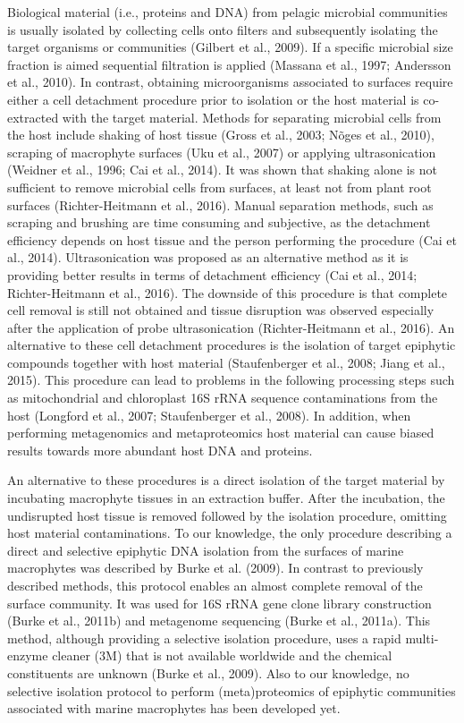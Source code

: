 \documentclass[12pt,]{article}
\begin{document}
Biological material (i.e., proteins and DNA) from pelagic microbial
communities is usually isolated by collecting cells onto filters and
subsequently isolating the target organisms or communities (Gilbert et
al., 2009). If a specific microbial size fraction is aimed sequential
filtration is applied (Massana et al., 1997; Andersson et al., 2010). In
contrast, obtaining microorganisms associated to surfaces require either
a cell detachment procedure prior to isolation or the host material is
co-extracted with the target material. Methods for separating microbial
cells from the host include shaking of host tissue (Gross et al., 2003;
Nõges et al., 2010), scraping of macrophyte surfaces (Uku et al., 2007)
or applying ultrasonication (Weidner et al., 1996; Cai et al., 2014). It
was shown that shaking alone is not sufficient to remove microbial cells
from surfaces, at least not from plant root surfaces (Richter-Heitmann
et al., 2016). Manual separation methods, such as scraping and brushing
are time consuming and subjective, as the detachment efficiency depends
on host tissue and the person performing the procedure (Cai et al.,
2014). Ultrasonication was proposed as an alternative method as it is
providing better results in terms of detachment efficiency (Cai et al.,
2014; Richter-Heitmann et al., 2016). The downside of this procedure is
that complete cell removal is still not obtained and tissue disruption
was observed especially after the application of probe ultrasonication
(Richter-Heitmann et al., 2016). An alternative to these cell detachment
procedures is the isolation of target epiphytic compounds together with
host material (Staufenberger et al., 2008; Jiang et al., 2015). This
procedure can lead to problems in the following processing steps such as
mitochondrial and chloroplast 16S rRNA sequence contaminations from the
host (Longford et al., 2007; Staufenberger et al., 2008). In addition,
when performing metagenomics and metaproteomics host material can cause
biased results towards more abundant host DNA and proteins.

An alternative to these procedures is a direct isolation of the target
material by incubating macrophyte tissues in an extraction buffer. After
the incubation, the undisrupted host tissue is removed followed by the
isolation procedure, omitting host material contaminations. To our
knowledge, the only procedure describing a direct and selective
epiphytic DNA isolation from the surfaces of marine macrophytes was
described by Burke et al. (2009). In contrast to previously described
methods, this protocol enables an almost complete removal of the surface
community. It was used for 16S rRNA gene clone library construction
(Burke et al., 2011b) and metagenome sequencing (Burke et al., 2011a).
This method, although providing a selective isolation procedure, uses a
rapid multi-enzyme cleaner (3M) that is not available worldwide and the
chemical constituents are unknown (Burke et al., 2009). Also to our
knowledge, no selective isolation protocol to perform (meta)proteomics
of epiphytic communities associated with marine macrophytes has been
developed yet.
\end{document}

